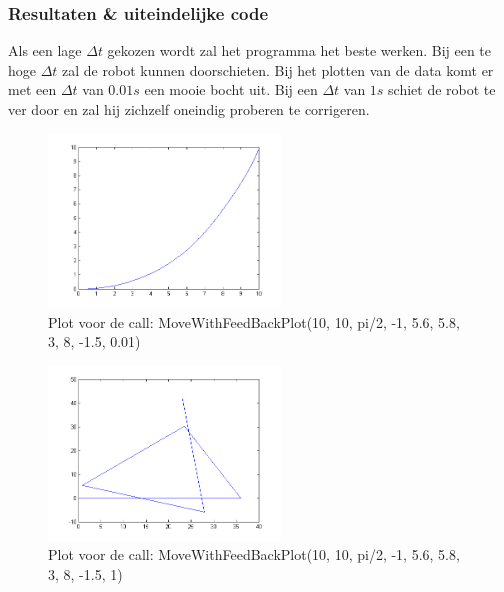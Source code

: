\documentclass[a4paper]{article}
\begin{document}
\subsubsection{Resultaten \& uiteindelijke code}
Als een lage $\Delta t$ gekozen wordt zal het programma het beste werken. Bij een te hoge $\Delta t$ zal de robot kunnen doorschieten. Bij het plotten van de data komt er met een $\Delta t$ van $0.01s$ een mooie bocht uit. Bij een $\Delta t$ van $1s$ schiet de robot te ver door en zal hij zichzelf oneindig proberen te corrigeren.
\begin{figure}[h]
	\centering
	\includegraphics[width=0.55\textwidth]{imgs/example_plot.png}
	\caption{Plot voor de call: MoveWithFeedBackPlot(10, 10, pi/2, -1, 5.6, 5.8, 3, 8, -1.5, 0.01)}
	\label{fig:lineairverband }
\end{figure}
\begin{figure}[h]
	\centering
	\includegraphics[width=0.55\textwidth]{imgs/fail_dt.png}
	\caption{Plot voor de call: MoveWithFeedBackPlot(10, 10, pi/2, -1, 5.6, 5.8, 3, 8, -1.5, 1)}
	\label{fig:lineairverband}
\end{figure}
\newpage
\end{document}
